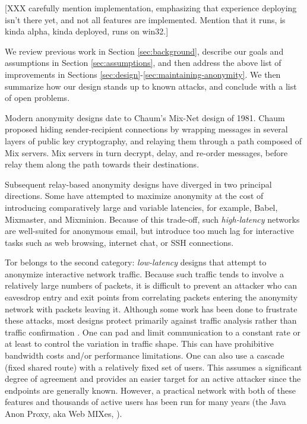 \documentclass[times,10pt,twocolumn]{article}
\begin{document}
[XXX carefully mention implementation, emphasizing that experience
deploying isn't there yet, and not all features are implemented.
Mention that it runs, is kinda alpha, kinda deployed, runs on win32.]

We review previous work in Section \ref{sec:background}, describe
our goals and assumptions in Section \ref{sec:assumptions},
and then address the above list of improvements in Sections
\ref{sec:design}-\ref{sec:maintaining-anonymity}. We then summarize
how our design stands up to known attacks, and conclude with a list of
open problems.


\label{sec:background}

\label{sec:related-work}
Modern anonymity designs date to Chaum's Mix-Net\cite{chaum-mix} design of
1981.  Chaum proposed hiding sender-recipient connections by wrapping
messages in several layers of public key cryptography, and relaying them
through a path composed of Mix servers.  Mix servers in turn decrypt, delay,
and re-order messages, before relay them along the path towards their
destinations.

Subsequent relay-based anonymity designs have diverged in two
principal directions.  Some have attempted to maximize anonymity at
the cost of introducing comparatively large and variable latencies,
for example, Babel\cite{babel}, Mixmaster\cite{mixmaster-spec}, and
Mixminion\cite{minion-design}.  Because of this
trade-off, such \emph{high-latency} networks are well-suited for anonymous
email, but introduce too much lag for interactive tasks such as web browsing,
internet chat, or SSH connections.

Tor belongs to the second category: \emph{low-latency} designs that
attempt to anonymize interactive network traffic.  Because such
traffic tends to involve a relatively large numbers of packets, it is
difficult to prevent an attacker who can eavesdrop entry and exit
points from correlating packets entering the anonymity network with
packets leaving it. Although some work has been done to frustrate
these attacks, most designs protect primarily against traffic analysis
rather than traffic confirmation \cite{or-jsac98}.  One can pad and
limit communication to a constant rate or at least to control the
variation in traffic shape. This can have prohibitive bandwidth costs
and/or performance limitations. One can also use a cascade (fixed
shared route) with a relatively fixed set of users. This assumes a
significant degree of agreement and provides an easier target for an active
attacker since the endpoints are generally known. However, a practical
network with both of these features and thousands of active users has
been run for many years (the Java Anon Proxy, aka Web MIXes,
\cite{web-mix}).
\end{document}
